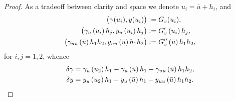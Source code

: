 \documentclass[final]{siamltex}
\begin{document}
\begin{proof}
	As a tradeoff between clarity and space we denote $u_i = {\bar{u}} + h_i$,  
	and 
	\begin{align*}
		\del{\gamma(u_i), y(u_i)} &:= G_v(u_i), \\ 
		\del{\gamma_u\del{u_i} h_j, y_u\del{u_i} h_j} 
			 	&:= G_v'\del{u_i}{h_j}, \\ 
		\del{\gamma_{uu}\del{\bar{u}} h_1h_2, y_{uu}\del{\bar{u}} h_1 h_2}
				&:= G_v''\del{\bar{u}}{h_1h_2}, \\ 
	\end{align*}
	for $i,j = 1,2$, whence
	\begin{align*}
		\delta\gamma &= \gamma_u\del{u_2}h_1 - \gamma_u\del{\bar{u}} h_1 - \gamma_{uu}\del{\bar{u}} h_1 h_2, \\
		\delta y &= y_u\del{u_2}h_1 - y_u\del{\bar{u}} h_1 - y_{uu}\del{\bar{u}} h_1 h_2.
	\end{align*}
	

\end{proof}
\end{document}
